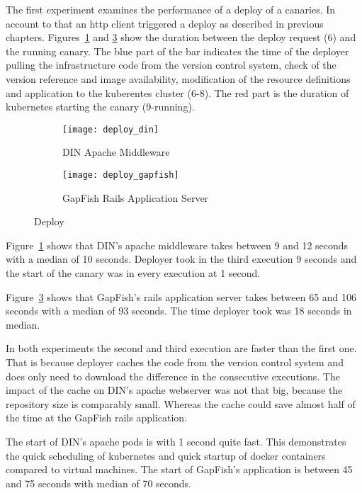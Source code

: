 The first experiment examines the performance of a deploy of a canaries. In account to
that an http client triggered a deploy as described in previous
chapters. Figures~\ref{fig:deploy_din} and \ref{fig:deploy_gapfish} show the duration
between the deploy request (6) and the running canary. The blue part of the bar indicates
the time of the deployer pulling the infrastructure code from the version control system,
check of the version reference and image availability, modification of the resource
definitions and application to the kuberentes cluster (6-8). The red part is the duration
of kubernetes starting the canary (9-running).

\begin{figure}[htbp]
  \label{fig:deploy}
  \centering
  \begin{subfigure}{.5\textwidth}
    \texttt{[image: deploy\_din]}
    \caption[DIN]{DIN Apache Middleware}
    \label{fig:deploy_din}
  \end{subfigure}%
  \begin{subfigure}{.5\textwidth}
    \texttt{[image: deploy\_gapfish]}
    \caption[GapFish]{GapFish Rails Application Server}
    \label{fig:deploy_gapfish}
  \end{subfigure}
  \caption[Deploy]{Deploy}
\end{figure}

Figure~\ref{fig:deploy_din} shows that DIN's apache middleware takes between 9 and 12
seconds with a median of 10 seconds. Deployer took in the third execution 9 seconds and
the start of the canary was in every execution at 1 second.

Figure~\ref{fig:deploy_gapfish} shows that GapFish's rails application server takes
between 65 and 106 seconds with a median of 93 seconds. The time deployer took was 18
seconds in median.

In both experiments the second and third execution are faster than the first one. That is
because deployer caches the code from the version control system and does only need to
download the difference in the consecutive executions. The impact of the cache on DIN's
apache webserver was not that big, because the repository size is comparably
small. Whereas the cache could save almost half of the time at the GapFish rails
application.

The start of DIN's apache pods is with 1 second quite fast. This demonstrates the quick
scheduling of kubernetes and quick startup of docker containers compared to virtual
machines. The start of GapFish's application is between 45 and 75 seconds with median of
70 seconds.

